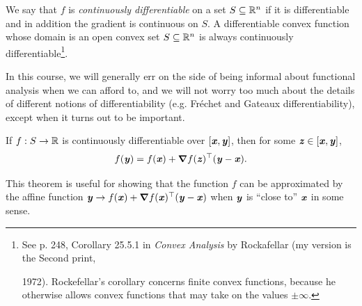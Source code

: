 We say that $f$ is \emph{continuously differentiable} on a set $S \subseteq \mathbb{R}^n $ if it is
differentiable and in addition the gradient is continuous on $S$.
A differentiable convex function whose domain is an
open convex set $S \subseteq \mathbb{R}^n $ is always continuously
differentiable\footnote{See p. 248, Corollary 25.5.1 in \emph{Convex
    Analysis} by Rockafellar (my version is the Second print,

  1972). Rockefellar's corollary concerns finite convex functions, because he
  otherwise allows convex functions that may take on the values $\pm \infty$. }.

\begin{remark*}
  In this course, we will generally err on the side of being informal
  about functional analysis when we can afford to, and we will not
  worry too much about the
  details of different notions of differentiability
  (e.g. Fr\'{e}chet and Gateaux differentiability), except when
  it turns out to be important.
\end{remark*}

\begin{theorem}
  If $f:S \rightarrow \mathbb{R}$
  is continuously differentiable over $[\boldsymbol{\mathit{x}}, \boldsymbol{\mathit{y}}]$, then for
  some $\boldsymbol{\mathit{z}} \in [\boldsymbol{\mathit{x}}, \boldsymbol{\mathit{y}}]$,
\begin{displaymath}
    f(\boldsymbol{\mathit{y}}) = f(\boldsymbol{\mathit{x}}) + \boldsymbol{\nabla} f(\boldsymbol{\mathit{z}})^\top (\boldsymbol{\mathit{y}}-\boldsymbol{\mathit{x}}).
\end{displaymath}
\end{theorem}

This theorem is useful for showing that the function $f$ can be
approximated by the affine function  ${\boldsymbol{\mathit{y}} \to f(\boldsymbol{\mathit{x}}) + \boldsymbol{\nabla} f(\boldsymbol{\mathit{x}})^\top (\boldsymbol{\mathit{y}}-\boldsymbol{\mathit{x}})}$
when $\boldsymbol{\mathit{y}}$ is ``close to'' $\boldsymbol{\mathit{x}}$ in some sense.


